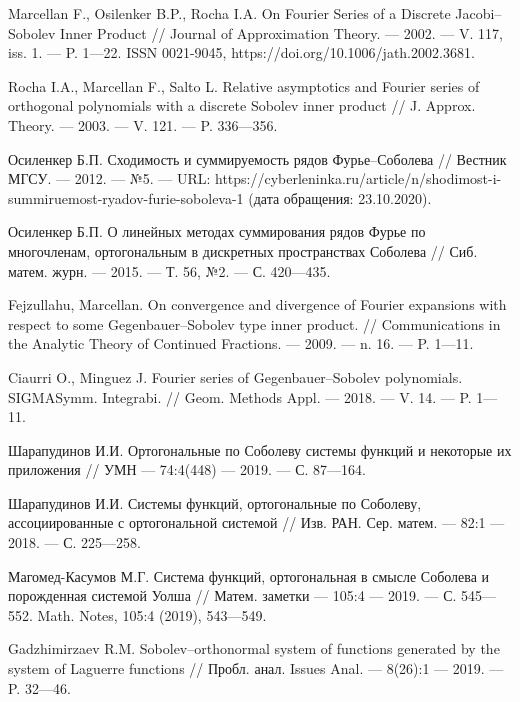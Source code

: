 \begin{thebibliography}{111}
Marcellan F., Osilenker B.P., Rocha I.A.
On Fourier Series of a Discrete Jacobi--Sobolev Inner Product
//
Journal of Approximation Theory.
--- 2002.
--- V. 117, iss. 1.
--- P. 1---22. 
ISSN 0021-9045, https://doi.org/10.1006/jath.2002.3681.
  
Rocha I.A., Marcellan F., Salto L.
Relative asymptotics and Fourier series of orthogonal polynomials with a discrete Sobolev inner product
//
J. Approx. Theory.
--- 2003.
--- V. 121.
--- P. 336---356.
  
Осиленкер Б.П.
Сходимость и суммируемость рядов Фурье--Соболева
//
Вестник МГСУ.
--- 2012.
--- №5.
--- URL: https://cyberleninka.ru/article/n/shodimost-i-summiruemost-ryadov-furie-soboleva-1 (дата обращения: 23.10.2020).
  
Осиленкер Б.П.
О линейных методах суммирования рядов Фурье по многочленам, ортогональным в дискретных пространствах Соболева
//
Сиб. матем. журн.
--- 2015.
--- Т. 56, №2.
--- С. 420---435.	

Fejzullahu, Marcellan. 
On convergence and divergence of Fourier expansions with respect to some Gegenbauer--Sobolev type inner product.
//
Communications in the Analytic Theory of Continued Fractions.
--- 2009.
--- n. 16.
--- P. 1---11.
  
Ciaurri O., Minguez J.
Fourier series of Gegenbauer--Sobolev polynomials. SIGMASymm. Integrabi.
//
Geom. Methods Appl. 
--- 2018.
--- V. 14.
--- P. 1---11.
  
Шарапудинов И.И.
Ортогональные по Соболеву системы функций и некоторые их приложения
//
УМН
--- 74:4(448) 
--- 2019.
--- С. 87---164.
  
Шарапудинов И.И.
Системы функций, ортогональные по Соболеву, ассоциированные с ортогональной системой
//
Изв. РАН. Сер. матем.
--- 82:1 
--- 2018.
--- С. 225---258.
  
Магомед-Касумов М.Г.
Система функций, ортогональная в смысле Соболева и порожденная системой Уолша
//
Матем. заметки
--- 105:4 
--- 2019.
--- С. 545---552.
Math. Notes, 105:4 (2019), 543---549.
  
Gadzhimirzaev R.M.
Sobolev--orthonormal system of functions generated by the system of Laguerre functions
//
Пробл. анал. Issues Anal.
--- 8(26):1 
--- 2019.
--- P. 32---46.
  

\end{thebibliography}
